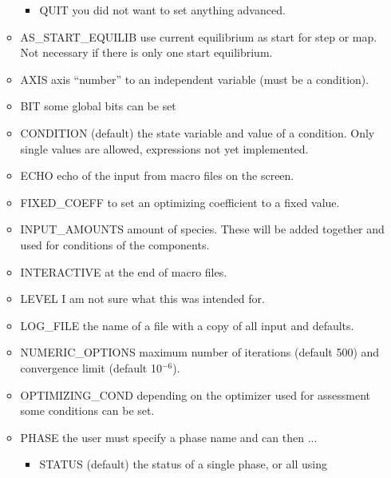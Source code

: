 \documentclass[12pt]{article}
\begin{document}
\begin{itemize}
\begin{itemize}
\begin{itemize}
    \item QUIT you did not want to set anything advanced.
    \end{itemize}
  \item AS\_START\_EQUILIB use current equilibrium as start for step
    or map.  Not necessary if there is only one start equilibrium.
  \item AXIS axis ``number'' to an independent variable (must be a
    condition).
  \item BIT some global bits can be set
  \item CONDITION (default) the state variable and value of a condition.
    Only single values are allowed, expressions not yet implemented.
  \item ECHO echo of the input from macro files on the screen.
  \item FIXED\_COEFF to set an optimizing coefficient to a fixed value.
  \item INPUT\_AMOUNTS amount of species.  These will be added
    together and used for conditions of the components.
  \item INTERACTIVE at the end of macro files.
  \item LEVEL I am not sure what this was intended for.
  \item LOG\_FILE the name of a file with a copy of all input and
    defaults.
  \item NUMERIC\_OPTIONS maximum number of iterations (default 500)
    and convergence limit (default 10$^{-6}$).
  \item OPTIMIZING\_COND depending on the optimizer used for
    assessment some conditions can be set.
  \item PHASE the user must specify a phase name and can then ...
    \begin{itemize}
    \item STATUS (default) the status of a single phase, or all using

\end{itemize}
\end{itemize}
\end{itemize}
\end{document}
